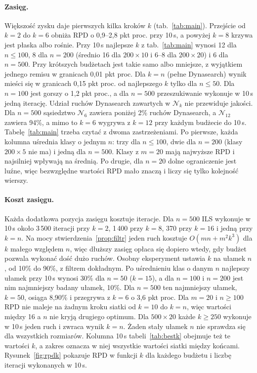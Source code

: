 \documentclass[letterpaper]{article} %
\theoremstyle{definition}
\newcommand{\N}{\mathcal{N}}
\begin{document}
\paragraph{Zasięg.} Większość zysku daje pierwszych kilka kroków $k$
(tab.~\ref{tab:main}). Przejście od $k=2$ do $k=6$ obniża RPD o 0,9--2,8 pkt proc. przy 10\,s, a powyżej $k=8$ krzywa jest płaska albo
rośnie. Przy 10\,s najlepsze $k$ z tab.~\ref{tab:main} wynosi 12 dla $n\leq 100$, 8 dla $n=200$
(średnio 16 dla $200\times 10$ i 6--8 dla $200\times 20$) i 6 dla $n=500$.
Przy krótszych budżetach jest takie samo albo mniejsze,
z wyjątkiem jednego remisu w granicach 0,01 pkt proc. Dla $k=n$ (pełne
Dynasearch) wynik mieści się w granicach 0,15 pkt proc. od najlepszego $k$
tylko dla $n\leq 50$. Dla $n=100$ jest gorszy o 1,2 pkt proc., a dla $n=500$ przeszukiwanie wykonuje w 10\,s jedną iterację. Udział ruchów Dynasearch zawartych
w $\N_k$ nie przewiduje jakości. Dla $n=500$ sąsiedztwo $\N_6$ zawiera
poniżej 2\% ruchów Dynasearch, a $\N_{12}$ zawiera 94\%, a mimo to $k=6$
wygrywa z $k=12$ przy każdym budżecie do 10\,s. Tabelę~\ref{tab:main} trzeba czytać z dwoma zastrzeżeniami. Po pierwsze, każda kolumna
uśrednia klasy o jednym $n$: trzy dla $n\leq 100$, dwie dla $n=200$
(klasy $200\times 5$ nie ma) i jedną dla $n=500$. Klasy z $m=20$ mają
najwyższe RPD i najsilniej wpływają na średnią. Po drugie, dla $n=20$ dolne
ograniczenie jest luźne, więc bezwzględne wartości RPD mało znaczą i liczy
się tylko kolejność wierszy.

\paragraph{Koszt zasięgu.} Każda dodatkowa pozycja zasięgu kosztuje
iteracje. Dla $n=500$ ILS wykonuje w 10\,s około 3\,500 iteracji przy
$k=2$, 1\,400 przy $k=8$, 370 przy $k=16$ i jedną przy $k=n$. Na mocy stwierdzenia~\ref{prop:filtr} jeden ruch
kosztuje $O(mn+m^2k^3)$ dla $k$ małego względem $n$, więc dłuższy zasięg
opłaca się dopiero wtedy, gdy budżet pozwala wykonać dość dużo ruchów.
Osobny
eksperyment ustawia $k$ na ułamek $n$, od 10\% do 90\%, z filtrem
dokładnym. Po uśrednieniu klas o danym $n$ najlepszy ułamek przy 10\,s
wynosi 30\% dla $n=50$ ($k=15$), a dla $n=100$ i $n=200$ jest nim
najmniejszy badany ułamek, 10\%. Dla $n=500$ ten najmniejszy ułamek,
$k=50$, osiąga 8,90\% i przegrywa z $k=6$ o 3,6 pkt proc. Dla $m=20$
i $n\geq 100$ RPD nie maleje na żadnym kroku siatki od $k=10$ do $k=n$,
więc wartości między 16 a $n$ nie kryją drugiego optimum. Dla
$500\times 20$ każde $k\geq 250$ wykonuje w 10\,s jeden ruch i zwraca
wynik $k=n$. Żaden stały ułamek $n$ nie sprawdza się dla wszystkich
rozmiarów. Kolumna 10\,s tabeli~\ref{tab:bestk} obejmuje też te wartości
$k$, a zakres oznacza w niej wszystkie wartości siatki między końcami. Rysunek~\ref{fig:rpdk} pokazuje RPD w funkcji $k$
dla każdego budżetu i liczbę iteracji wykonanych w 10\,s.
\end{document}
